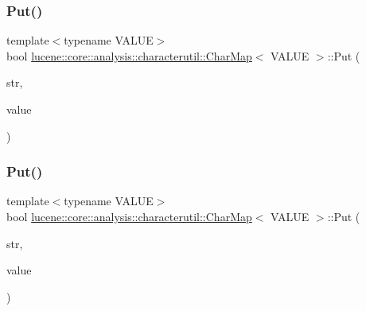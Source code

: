 \mbox{\label{classlucene_1_1core_1_1analysis_1_1characterutil_1_1CharMap_aa93ef6c5bfec74a0533a9cd967adfc59}} 
\subsubsection{\texorpdfstring{Put()}{Put()}\hspace{0.1cm}{\footnotesize\ttfamily [3/4]}}
{\footnotesize\ttfamily template$<$typename V\+A\+L\+UE$>$ \\
bool \mbox{\hyperlink{classlucene_1_1core_1_1analysis_1_1characterutil_1_1CharMap}{lucene\+::core\+::analysis\+::characterutil\+::\+Char\+Map}}$<$ V\+A\+L\+UE $>$\+::Put (\begin{DoxyParamCaption}\item[{\mbox{\hyperlink{ZlibCrc32_8h_a2c212835823e3c54a8ab6d95c652660e}{const}} std\+::string \&}]{str,  }\item[{V\+A\+L\+UE \&}]{value }\end{DoxyParamCaption})\hspace{0.3cm}{\ttfamily [inline]}}

\mbox{\label{classlucene_1_1core_1_1analysis_1_1characterutil_1_1CharMap_a72fcb8b83852bb787de1204635d3bf21}} 
\subsubsection{\texorpdfstring{Put()}{Put()}\hspace{0.1cm}{\footnotesize\ttfamily [4/4]}}
{\footnotesize\ttfamily template$<$typename V\+A\+L\+UE$>$ \\
bool \mbox{\hyperlink{classlucene_1_1core_1_1analysis_1_1characterutil_1_1CharMap}{lucene\+::core\+::analysis\+::characterutil\+::\+Char\+Map}}$<$ V\+A\+L\+UE $>$\+::Put (\begin{DoxyParamCaption}\item[{\mbox{\hyperlink{ZlibCrc32_8h_a2c212835823e3c54a8ab6d95c652660e}{const}} std\+::string \&}]{str,  }\item[{V\+A\+L\+UE \&\&}]{value }\end{DoxyParamCaption})\hspace{0.3cm}{\ttfamily [inline]}}

